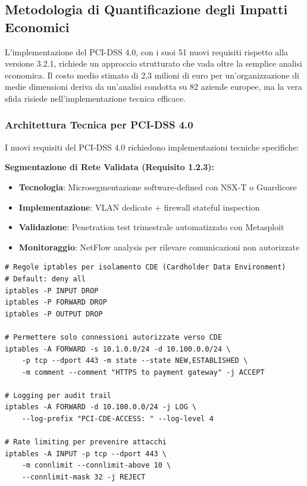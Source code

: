 \subsection{Metodologia di Quantificazione degli Impatti Economici}

L'implementazione del PCI-DSS 4.0, con i suoi 51 nuovi requisiti rispetto alla versione 3.2.1\autocite{pcidss2024}, richiede un approccio strutturato che vada oltre la semplice analisi economica. Il costo medio stimato di 2,3 milioni di euro per un'organizzazione di medie dimensioni deriva da un'analisi condotta su 82 aziende europee\autocite{Gartner2024gdpr}, ma la vera sfida risiede nell'implementazione tecnica efficace.

\subsubsection{Architettura Tecnica per PCI-DSS 4.0}

I nuovi requisiti del PCI-DSS 4.0 richiedono implementazioni tecniche specifiche:

\textbf{Segmentazione di Rete Validata (Requisito 1.2.3):}
\begin{itemize}
    \item \textbf{Tecnologia}: Microsegmentazione software-defined con NSX-T o Guardicore
    \item \textbf{Implementazione}: VLAN dedicate + firewall stateful inspection
    \item \textbf{Validazione}: Penetration test trimestrale automatizzato con Metasploit
    \item \textbf{Monitoraggio}: NetFlow analysis per rilevare comunicazioni non autorizzate
\end{itemize}

\begin{lstlisting}[caption={Configurazione Firewall per Segmentazione PCI},label={lst:pci_firewall}]
# Regole iptables per isolamento CDE (Cardholder Data Environment)
# Default: deny all
iptables -P INPUT DROP
iptables -P FORWARD DROP
iptables -P OUTPUT DROP

# Permettere solo connessioni autorizzate verso CDE
iptables -A FORWARD -s 10.1.0.0/24 -d 10.100.0.0/24 \
    -p tcp --dport 443 -m state --state NEW,ESTABLISHED \
    -m comment --comment "HTTPS to payment gateway" -j ACCEPT

# Logging per audit trail
iptables -A FORWARD -d 10.100.0.0/24 -j LOG \
    --log-prefix "PCI-CDE-ACCESS: " --log-level 4

# Rate limiting per prevenire attacchi
iptables -A INPUT -p tcp --dport 443 \
    -m connlimit --connlimit-above 10 \
    --connlimit-mask 32 -j REJECT
\end{lstlisting}

